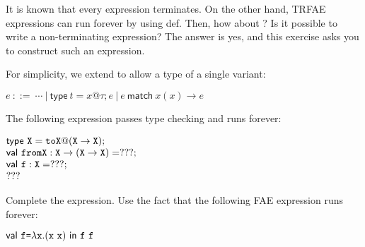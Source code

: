 \begin{exercise}

It is known that every \plang expression terminates. On the other
hand, \textsf{TRFAE} expressions can run forever by using \textsf{def}. Then, how
about \Lang? Is it possible to write a non-terminating \Lang
expression? The answer is yes, and this exercise asks you to construct such an
expression.

For simplicity, we extend \Lang to allow a type of a single variant:

$e\ ::=\ \cdots\ |\ \textsf{type}\ t=x@\tau;e\ |\ e\ \textsf{match}\ x(x)\rightarrow e$

The following \Lang expression passes type checking and runs forever:

$\begin{array}{@{}l@{}}
  \textsf{type}\ \cX=\code{toX}@(\tarrow{\cX}{\cX}); \\
  \textsf{val}\ \code{fromX}:\tarrow{\cX}{(\tarrow{\cX}{\cX})}=???;\\
  \textsf{val}\ \cf:\cX=???;\\
  ???
\end{array}$

Complete the expression. Use the fact that the following
\textsf{FAE} expression runs forever:

$\textsf{val}\ \texttt{f}\texttt{=}\lambda\texttt{x}.(\texttt{x}\ \texttt{x})\ \textsf{in}\ \texttt{f}\ \texttt{f}$

\end{exercise}
